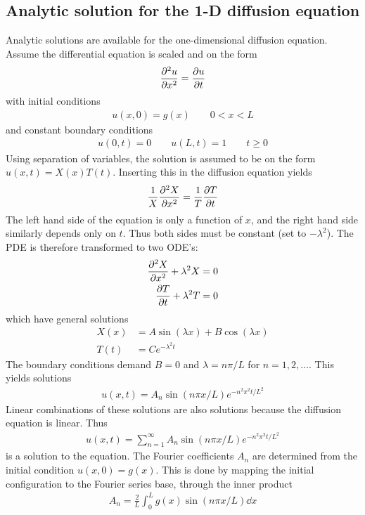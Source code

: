 \documentclass[aps,reprint]{revtex4-1}
\begin{document}
\subsection{Analytic solution for the 1-D diffusion equation}
Analytic solutions are available for the one-dimensional diffusion equation. Assume
the differential equation is scaled and on the form
\begin{align*}
  \pdv[2]{u}{x} = \pdv{u}{t}
\end{align*}
with initial conditions
\begin{align*}
  u(x,0) = g(x) \qquad 0 < x < L
\end{align*}
and constant boundary conditions
\begin{align*}
  u(0,t) = 0 \qquad u(L,t) = 1 \qquad t \geq 0
\end{align*}
Using separation of variables, the solution is assumed to be on the form
$u(x,t) = X(x)T(t)$. Inserting this in the diffusion equation yields
\begin{align*}
  \frac{1}{X} \pdv[2]{X}{x} = \frac{1}{T} \pdv{T}{t}
\end{align*}
The left hand side of the equation is only a function of $x$, and the right hand
side similarly depends only on $t$. Thus both sides must be constant (set to $-\lambda^2$).
The PDE is therefore transformed to two ODE's:
\begin{align*}
  \pdv[2]{X}{x} + \lambda^2 X &= 0 \\
  \pdv{T}{t}    + \lambda^2 T &= 0
\end{align*}
which have general solutions
\begin{align*}
  X(x) &= A\sin{(\lambda x)} + B\cos{(\lambda x)} \\
  T(t) &= Ce^{-\lambda^2 t}
\end{align*}
The boundary conditions demand $B = 0$ and $\lambda = n \pi /L$ for $n = 1,2,\hdots$.
This yields solutions
\begin{align*}
  u(x,t) = A_n \sin{(n\pi x/L)}e^{-n^2 \pi^2 t/ L^2}
\end{align*}
Linear combinations of these solutions are also solutions because the diffusion
equation is linear. Thus
\begin{align}
  u(x,t) = \sum_{n = 1}^{\infty} A_n \sin{(n\pi x/L)}e^{-n^2 \pi^2 t/ L^2}
\end{align}
is a solution to the equation. The Fourier coefficients $A_n$ are determined
from the initial condition $u(x,0) = g(x)$. This is done by mapping the initial
configuration to the Fourier series base, through the inner product
\begin{align*}
  A_n = \frac{2}{L}\int_0^L g(x) \sin{(n \pi x / L)} \dd{x}
\end{align*}
\end{document}
